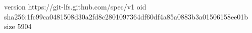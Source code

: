 version https://git-lfs.github.com/spec/v1
oid sha256:1fc99ca0481508d30a2fd8c2801097364df60df4a85a0883b3a01506158ee01b
size 5904
